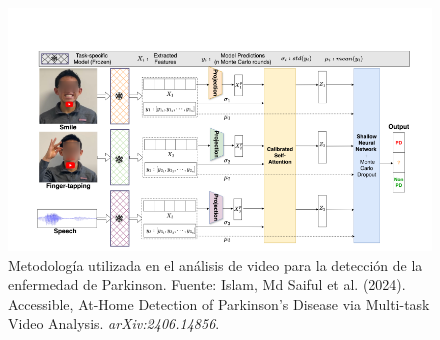 \documentclass[listof=nochaptergap,12pt,times,authoryear]{report}
\begin{document}
\begin{figure}[H]
    \centering
    \includegraphics[width=\textwidth]{A5 - 1.png}
    \caption{Metodología utilizada en el análisis de video para la detección de la enfermedad de Parkinson. Fuente: Islam, Md Saiful et al. (2024). Accessible, At-Home Detection of Parkinson's Disease via Multi-task Video Analysis. \textit{arXiv:2406.14856}.}
    \label{fig:metodologia_video}
\end{figure}
\end{document}
